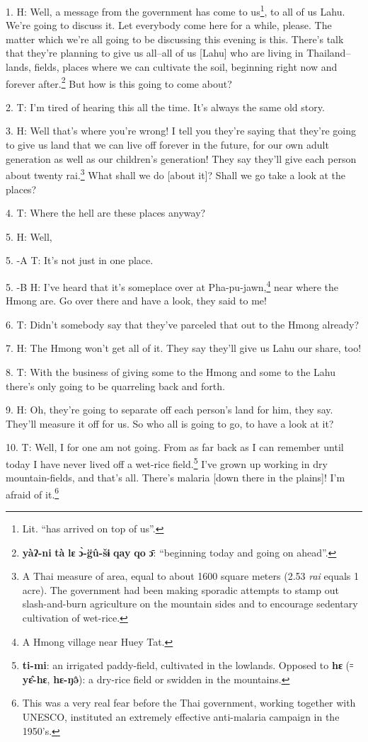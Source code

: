 \setcounter{footnote}{0}

1. H: Well, a message from the government has come to us\footnote{Lit. ``has arrived on top of us''.}, to all of us Lahu.
We're going to discuss it. Let everybody come here for a while, please. The matter
which we're all going to be discussing this evening is this. There's talk that
they're planning to give us all--all of us [Lahu] who are living in Thailand--lands,
fields, places where we can cultivate the soil, beginning right now and forever
after.\footnote{\textbf{yàʔ-ni} \textbf{tà} \textbf{lɛ} \textbf{ɔ̀-g̈û-šɨ} \textbf{qay} \textbf{qo} \textbf{ɔ̄}: ``beginning today and going on ahead''.} But how is this going to come about?

2. T: I'm tired of hearing this all the time. It's always the same old story.

3. H: Well that's where you're wrong! I tell you they're saying that they're going
to give us land that we can live off forever in the future, for our own adult generation
as well as our children's generation! They say they'll give each person about twenty
rai.\footnote{A Thai measure of area, equal to about 1600 square meters (2.53 \textit{rai } equals 1 acre). The government had been making sporadic attempts to stamp out slash-and-burn agriculture on the mountain sides and to encourage sedentary cultivation of wet-rice.} What shall we do [about it]? Shall we go take a look at the places?

4. T: Where the hell are these places anyway?

5. H: Well,

5. -A T: It's not just in one place.

5. -B H: I've heard that it's someplace over at Pha-pu-jawn,\footnote{A Hmong village near Huey Tat.} near where the Hmong
are. Go over there and have a look, they said to me!

6. T: Didn't somebody say that they've parceled that out to the Hmong already?

7. H: The Hmong won't get all of it. They say they'll give us Lahu our share, too!

8. T: With the business of giving some to the Hmong and some to the Lahu there's
only going to be quarreling back and forth.

9. H: Oh, they're going to separate off each person's land for him, they say. They'll
measure it off for us. So who all is going to go, to have a look at it?

10. T: Well, I for one am not going. From as far back as I can remember until
today I have never lived off a wet-rice field.\footnote{\textbf{ti-mi}: an irrigated paddy-field, cultivated in the lowlands. Opposed to \textbf{hɛ} (꞊ \textbf{yɛ̂-hɛ}, \textbf{hɛ-ŋə̂}): a dry-rice field or swidden in the mountains.} I've grown up working in dry
mountain-fields, and that's all. There's malaria [down there in the plains]! I'm
afraid of it.\footnote{This was a very real fear before the Thai government, working together with UNESCO, instituted an extremely effective anti-malaria campaign in the 1950's.}

